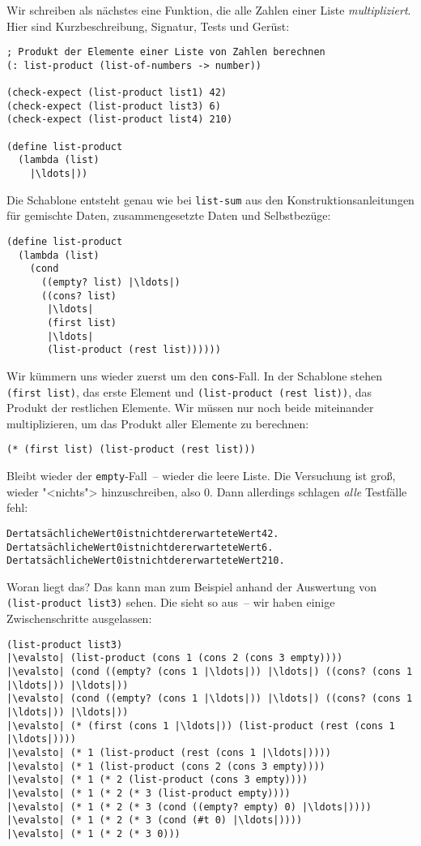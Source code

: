 Wir schreiben als nächstes eine Funktion, die alle Zahlen einer Liste
\emph{multipliziert}.   Hier sind Kurzbeschreibung, Signatur, Tests
und Gerüst:
%
\begin{lstlisting}
; Produkt der Elemente einer Liste von Zahlen berechnen
(: list-product (list-of-numbers -> number))

(check-expect (list-product list1) 42)
(check-expect (list-product list3) 6)
(check-expect (list-product list4) 210)

(define list-product
  (lambda (list)
    |\ldots|))
\end{lstlisting}
%
Die Schablone entsteht genau wie bei \lstinline{list-sum} aus den
Konstruktionsanleitungen für gemischte Daten, zusammengesetzte Daten
und Selbstbezüge:
%
\begin{lstlisting}
(define list-product
  (lambda (list)
    (cond
      ((empty? list) |\ldots|)
      ((cons? list)
       |\ldots|
       (first list) 
       |\ldots|
       (list-product (rest list))))))
\end{lstlisting}
%
Wir kümmern uns wieder zuerst um den
\lstinline{cons}-Fall. In der Schablone stehen \lstinline{(first list)}, das erste
Element und \lstinline{(list-product (rest list))}, das Produkt der
restlichen Elemente.  Wir müssen nur noch beide miteinander
multiplizieren, um das Produkt aller Elemente zu berechnen:
%
\begin{lstlisting}
(* (first list) (list-product (rest list)))
\end{lstlisting}
%
Bleibt wieder der \lstinline{empty}-Fall~-- wieder die leere Liste.
Die Versuchung ist groß, wieder "<nichts"> hinzuschreiben, also 0.
Dann allerdings schlagen \emph{alle} Testfälle fehl:
\begin{alltt}
Der tatsächliche Wert 0 ist nicht der erwartete Wert 42.
Der tatsächliche Wert 0 ist nicht der erwartete Wert 6.
Der tatsächliche Wert 0 ist nicht der erwartete Wert 210.
\end{alltt}
%
Woran liegt das?  Das kann man zum Beispiel anhand der Auswertung von
\lstinline{(list-product list3)} sehen.  Die sieht so aus~-- wir haben
einige Zwischenschritte ausgelassen:
%
\begin{lstlisting}
(list-product list3)
|\evalsto| (list-product (cons 1 (cons 2 (cons 3 empty))))
|\evalsto| (cond ((empty? (cons 1 |\ldots|)) |\ldots|) ((cons? (cons 1 |\ldots|)) |\ldots|))
|\evalsto| (cond ((empty? (cons 1 |\ldots|)) |\ldots|) ((cons? (cons 1 |\ldots|)) |\ldots|))
|\evalsto| (* (first (cons 1 |\ldots|)) (list-product (rest (cons 1 |\ldots|))))
|\evalsto| (* 1 (list-product (rest (cons 1 |\ldots|))))
|\evalsto| (* 1 (list-product (cons 2 (cons 3 empty))))
|\evalsto| (* 1 (* 2 (list-product (cons 3 empty))))
|\evalsto| (* 1 (* 2 (* 3 (list-product empty))))
|\evalsto| (* 1 (* 2 (* 3 (cond ((empty? empty) 0) |\ldots|))))
|\evalsto| (* 1 (* 2 (* 3 (cond (#t 0) |\ldots|))))
|\evalsto| (* 1 (* 2 (* 3 0)))
\end{lstlisting}
